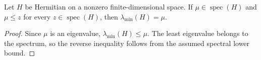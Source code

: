 \begin{lemma}
    \label{lem:ground_spectrum_minimum}
    \leanok
    Let $H$ be Hermitian on a nonzero finite-dimensional space. If
    $\mu\in\operatorname{spec}(H)$ and $\mu\le z$ for every
    $z\in\operatorname{spec}(H)$, then $\lambda_{\min}(H)=\mu$.
\end{lemma}
\begin{proof}\leanok
    Since $\mu$ is an eigenvalue, $\lambda_{\min}(H)\le\mu$.
    The least eigenvalue belongs to the spectrum, so the reverse inequality
    follows from the assumed spectral lower bound.
\end{proof}
